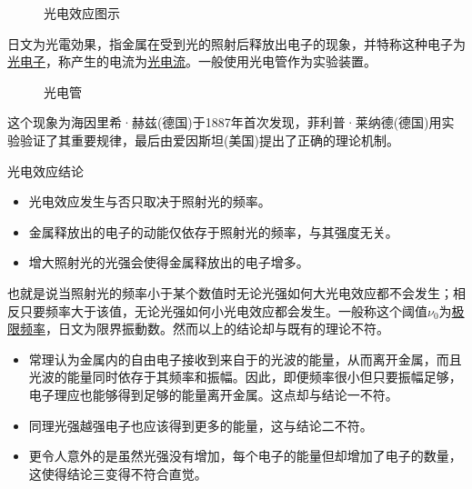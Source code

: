 \begin{figure}[ht!]
    \centering
    \caption{光电效应图示}
\end{figure}
日文为光電効果，指金属在受到光的照射后释放出电子的现象，并特称这种电子为\underline{光电子}，称产生的电流为\underline{光电流}。一般使用光电管作为实验装置。
\begin{figure}[ht!]
    \centering
    \caption{光电管}
\end{figure}
这个现象为海因里希·赫兹(德国)于1887年首次发现，菲利普·莱纳德(德国)用实验验证了其重要规律，最后由爱因斯坦(美国)提出了正确的理论机制。
\begin{itembox}[l]{光电效应结论}
    \begin{itemize}
        \item 光电效应发生与否只取决于照射光的频率。
        \item 金属释放出的电子的动能仅依存于照射光的频率，与其强度无关。
        \item 增大照射光的光强会使得金属释放出的电子增多。
    \end{itemize}
\end{itembox}
也就是说当照射光的频率小于某个数值时无论光强如何大光电效应都不会发生；相反只要频率大于该值，无论光强如何小光电效应都会发生。一般称这个阈值$\nu_0$为\underline{极限频率}，日文为限界振動数。然而以上的结论却与既有的理论不符。
\begin{itemize}
    \item 常理认为金属内的自由电子接收到来自于的光波的能量，从而离开金属，而且光波的能量同时依存于其频率和振幅。因此，即便频率很小但只要振幅足够，电子理应也能够得到足够的能量离开金属。这点却与结论一不符。
    \item 同理光强越强电子也应该得到更多的能量，这与结论二不符。
    \item 更令人意外的是虽然光强没有增加，每个电子的能量但却增加了电子的数量，这使得结论三变得不符合直觉。
\end{itemize}

